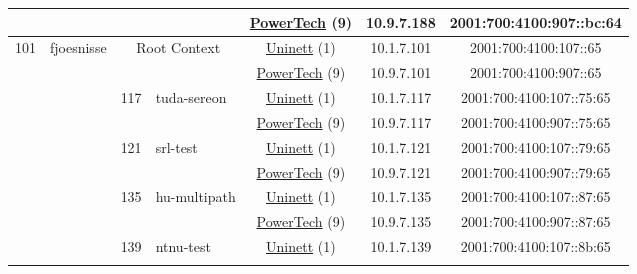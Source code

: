 \begin{small}
\begin{center}
\begin{longtable}{|c|c|c|c|c|c|c|c|}
  &  &  &  & \multicolumn{2}{|c|}{\tiny{\href{http://www.powertech.no}{PowerTech} (9)}} & \tiny{10.9.7.188} & \tiny{2001:700:4100:907::bc:64} \\ \hline
 \multirow{30}{*}{\tiny{101}} & \multicolumn{1}{|l|}{\multirow{30}{*}{\tiny{fjoesnisse}}} & \multicolumn{2}{|c|}{\multirow{2}{*}{\tiny{Root Context}}} & \multicolumn{2}{|c|}{\tiny{\href{https://www.uninett.no}{Uninett} (1)}} & \tiny{10.1.7.101} & \tiny{2001:700:4100:107::65} \\* \cline{5-5}\cline{6-6}\cline{7-7}\cline{8-8}
  &  & \multicolumn{2}{|c|}{} & \multicolumn{2}{|c|}{\tiny{\href{http://www.powertech.no}{PowerTech} (9)}} & \tiny{10.9.7.101} & \tiny{2001:700:4100:907::65} \\* \cline{3-3}\cline{4-4}\cline{5-5}\cline{6-6}\cline{7-7}\cline{8-8}
  &  & \multirow{2}{*}{\tiny{117}} & \multicolumn{1}{|l|}{\multirow{2}{*}{\tiny{tuda-sereon}}} & \multicolumn{2}{|c|}{\tiny{\href{https://www.uninett.no}{Uninett} (1)}} & \tiny{10.1.7.117} & \tiny{2001:700:4100:107::75:65} \\* \cline{5-5}\cline{6-6}\cline{7-7}\cline{8-8}
  &  &  &  & \multicolumn{2}{|c|}{\tiny{\href{http://www.powertech.no}{PowerTech} (9)}} & \tiny{10.9.7.117} & \tiny{2001:700:4100:907::75:65} \\* \cline{3-3}\cline{4-4}\cline{5-5}\cline{6-6}\cline{7-7}\cline{8-8}
  &  & \multirow{2}{*}{\tiny{121}} & \multicolumn{1}{|l|}{\multirow{2}{*}{\tiny{srl-test}}} & \multicolumn{2}{|c|}{\tiny{\href{https://www.uninett.no}{Uninett} (1)}} & \tiny{10.1.7.121} & \tiny{2001:700:4100:107::79:65} \\* \cline{5-5}\cline{6-6}\cline{7-7}\cline{8-8}
  &  &  &  & \multicolumn{2}{|c|}{\tiny{\href{http://www.powertech.no}{PowerTech} (9)}} & \tiny{10.9.7.121} & \tiny{2001:700:4100:907::79:65} \\* \cline{3-3}\cline{4-4}\cline{5-5}\cline{6-6}\cline{7-7}\cline{8-8}
  &  & \multirow{2}{*}{\tiny{135}} & \multicolumn{1}{|l|}{\multirow{2}{*}{\tiny{hu-multipath}}} & \multicolumn{2}{|c|}{\tiny{\href{https://www.uninett.no}{Uninett} (1)}} & \tiny{10.1.7.135} & \tiny{2001:700:4100:107::87:65} \\* \cline{5-5}\cline{6-6}\cline{7-7}\cline{8-8}
  &  &  &  & \multicolumn{2}{|c|}{\tiny{\href{http://www.powertech.no}{PowerTech} (9)}} & \tiny{10.9.7.135} & \tiny{2001:700:4100:907::87:65} \\* \cline{3-3}\cline{4-4}\cline{5-5}\cline{6-6}\cline{7-7}\cline{8-8}
  &  & \multirow{2}{*}{\tiny{139}} & \multicolumn{1}{|l|}{\multirow{2}{*}{\tiny{ntnu-test}}} & \multicolumn{2}{|c|}{\tiny{\href{https://www.uninett.no}{Uninett} (1)}} & \tiny{10.1.7.139} & \tiny{2001:700:4100:107::8b:65} \\* \cline{5-5}\cline{6-6}\cline{7-7}\cline{8-8}

\end{longtable}
\end{center}
\end{small}
